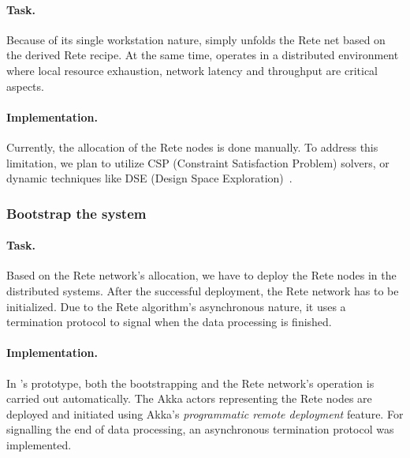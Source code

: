 \paragraph{Task.} Because of its single workstation nature, \eiq{} simply unfolds the Rete net based on the derived Rete recipe. At the same time, \iqd{} operates in a distributed environment where local resource exhaustion, network latency and throughput are critical aspects. 

\paragraph{Implementation.} Currently, the allocation of the Rete nodes is done manually. To address this limitation, we plan to utilize CSP (Constraint Satisfaction Problem) solvers, or dynamic techniques like DSE (Design Space Exploration)~\cite{DSE11}. 

\subsubsection{Bootstrap the system}

\paragraph{Task.} Based on the Rete network's allocation, we have to deploy the Rete nodes in the distributed systems. After the successful deployment, the Rete network has to be initialized. Due to the Rete algorithm's asynchronous nature, it uses a termination protocol to signal when the data processing is finished. 

\paragraph{Implementation.} In \iqd{}'s prototype, both the bootstrapping and the Rete network's operation is carried out automatically. The Akka actors representing the Rete nodes are deployed and initiated using Akka's \textit{programmatic remote deployment} feature. For signalling the end of data processing, an asynchronous termination protocol was implemented. 

